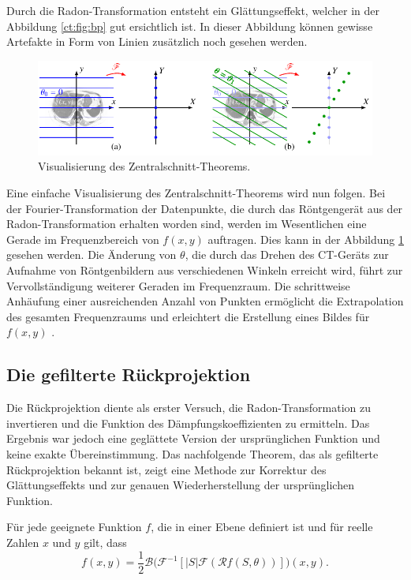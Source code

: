Durch die Radon-Transformation entsteht ein Glättungseffekt, welcher in  der Abbildung \ref{ct:fig:bp} gut ersichtlich ist. In dieser Abbildung können gewisse Artefakte in Form von Linien zusätzlich noch gesehen werden.

\begin{figure}
	\centering
	\includegraphics{papers/ct/images/zentralschnitt.pdf}
	\caption{Visualisierung des Zentralschnitt-Theorems.}
	\label{ct:img:central-slice}
\end{figure}
Eine einfache Visualisierung des Zentralschnitt-Theorems wird nun folgen. Bei der Fourier-Transformation der Datenpunkte, die durch das Röntgengerät aus der Radon-Transformation erhalten worden sind, werden im Wesentlichen eine Gerade im Frequenzbereich von $f(x, y)$ auftragen. Dies kann in der Abbildung \ref{ct:img:central-slice} gesehen werden. 
Die Änderung von $\theta$, die durch das Drehen des CT-Geräts zur Aufnahme von Röntgenbildern aus verschiedenen Winkeln erreicht wird, führt zur Vervollständigung weiterer Geraden im Frequenzraum. Die schrittweise Anhäufung einer ausreichenden Anzahl von Punkten ermöglicht die Extrapolation des gesamten Frequenzraums und erleichtert die Erstellung eines Bildes für $f(x, y)$ \cite{condensate_radon_2020}.


\subsection{Die gefilterte Rückprojektion
	\label{ct:subsection:gefilterterueck}}
Die Rückprojektion diente als erster Versuch, die Radon-Transformation zu invertieren und die Funktion des Dämpfungskoeffizienten zu ermitteln. Das Ergebnis war jedoch eine geglättete Version der ursprünglichen Funktion und keine exakte Übereinstimmung. Das nachfolgende Theorem, das als gefilterte Rückprojektion bekannt ist, zeigt eine Methode zur Korrektur des Glättungseffekts und zur genauen Wiederherstellung der ursprünglichen Funktion.

\begin{satz}
%
	Für jede geeignete Funktion $f$, die in einer Ebene definiert ist und für reelle Zahlen $x$ und $y$ gilt, dass
	\begin{equation}
		f(x, y) = \dfrac{1}{2}\mathscr{B}\biggl(\mathscr{F}^{-1}[|S|\mathscr{F}(\mathscr{R}f(S, \theta))]\biggr)(x,y).
	\end{equation}
\end{satz}

